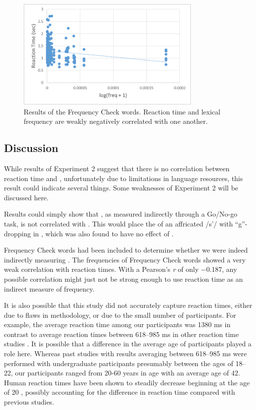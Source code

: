 \documentclass[output=paper,newtxmath,modfonts,nonflat,final]{langsci/langscibook}
\begin{document}
\begin{figure}
\includegraphics[width=0.8\textwidth]{figures/fig-moeng-6.png}
\caption{Results of the Frequency Check words. Reaction time and lexical frequency are weakly negatively correlated with one another.}
\label{fig:moeng:7}
\end{figure}

\subsection{Discussion}\label{sec:moeng:6.4}

While results of Experiment 2 suggest that there is no correlation between reaction time and , unfortunately due to limitations in language resources, this result could indicate several things. Some weaknesses of Experiment 2 will be discussed here.

Results could simply show that , as measured indirectly through a Go/No-go task, is not correlated with . This would place the  of an affricated /s’/ with “g”-dropping in , which was also found to have no effect of  \citep{labov2011principles}.

Frequency Check words had been included to determine whether we were indeed indirectly measuring . The frequencies of Frequency Check words showed a very weak correlation with reaction times. With a Pearson’s \textit{r} of only −0.187, any possible correlation might just not be strong enough to use reaction time as an indirect measure of frequency. 

It is also possible that this study did not accurately capture reaction times, either due to flaws in methodology, or due to the small number of participants. For example, the average reaction time among our participants was 1380 ms in contrast to average reaction times between 618–985 ms in other reaction time studies \citep{brysbaert2011word}. It is possible that a difference in the average age of participants played a role here. Whereas past studies with results averaging between 618–985 ms were performed with undergraduate participants presumably between the ages of 18–22, our participants ranged from 20-60 years in age with an average age of 42. Human reaction times have been shown to steadily decrease beginning at the age of 20 \citep{pierson1958movement}, possibly accounting for the difference in reaction time compared with previous studies.
\end{document}

